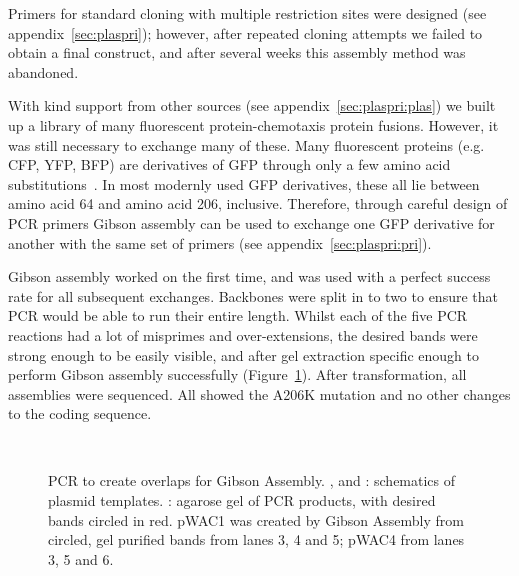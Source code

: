 \documentclass[../main.tex]{subfiles}
\begin{document}
Primers for standard cloning with multiple restriction sites were designed (see appendix~\ref{sec:plaspri}); however, after repeated cloning attempts we failed to obtain a final construct, and after several weeks this assembly method was abandoned.

With kind support from other sources (see appendix~\ref{sec:plaspri:plas}) we built up a library of many fluorescent protein-chemotaxis protein fusions. However, it was still necessary to exchange many of these. Many fluorescent proteins (e.g. CFP, YFP, BFP) are derivatives of GFP through only a few amino acid substitutions~\citep{tsien98}. In most modernly used GFP derivatives, these all lie between amino acid 64 and amino acid 206, inclusive. Therefore, through careful design of PCR primers Gibson assembly can be used to exchange one GFP derivative for another with the same set of primers (see appendix~\ref{sec:plaspri:pri}).

Gibson assembly worked on the first time, and was used with a perfect success rate for all subsequent exchanges. Backbones were split in to two to ensure that PCR would be able to run their entire length. Whilst each of the five PCR reactions had a lot of misprimes and over-extensions, the desired bands were strong enough to be easily visible, and after gel extraction specific enough to perform Gibson assembly successfully (Figure~\ref{fig:results:gibson}). After transformation, all assemblies were sequenced. All showed the A206K mutation and no other changes to the coding sequence.

\begin{figure}
\begin{center}
\\
\caption[PCR results for Gibson Assembly]{PCR to create overlaps for Gibson Assembly. ,  and : schematics of plasmid templates. : agarose gel of PCR products, with desired bands circled in red. pWAC1 was created by Gibson Assembly from circled, gel purified bands from lanes 3, 4 and 5; pWAC4 from lanes 3, 5 and 6.}
\label{fig:results:gibson}
\end{center}
\end{figure}
\newpage
\end{document}
